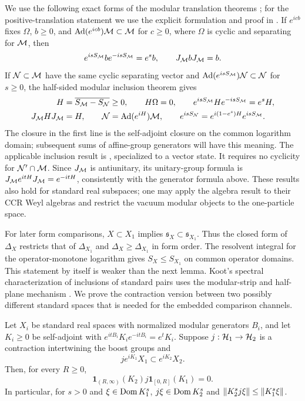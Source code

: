 We use the following exact forms of the modular translation theorems
\cite{Borchers1992,ArakiZsido2005}; for the positive-translation
statement we use the explicit formulation and proof in
\cite[Theorem~II.5.2]{Borchers2000}. If $e^{icb}$ fixes $\Omega$, $b\ge0$,
and $\operatorname{Ad}(e^{icb})\mathcal M\subset\mathcal M$ for $c\ge0$, where $\Omega$ is cyclic
and separating for $\mathcal M$, then
\begin{equation}\label{F:Borchers}
 e^{isS_\mathcal M}b e^{-isS_\mathcal M}=e^s b,\qquad J_\mathcal M bJ_\mathcal M=b.
\end{equation}
If $\mathcal N\subset\mathcal M$ have the same cyclic separating vector and
$\operatorname{Ad}(e^{isS_\mathcal M})\mathcal N\subset\mathcal N$ for $s\ge0$, the
half-sided modular inclusion theorem gives
\begin{equation}\label{F:HSMI}
 \begin{split}
 H&=\overline{S_\mathcal M-S_\mathcal N}\ge0,\qquad H\Omega=0,\qquad
 e^{isS_\mathcal M}He^{-isS_\mathcal M}=e^sH,\\
 J_\mathcal M HJ_\mathcal M&=H,\qquad
 \mathcal N=\operatorname{Ad}(e^{iH})\mathcal M,\qquad
 e^{isS_\mathcal N}=e^{i(1-e^s)H}e^{isS_\mathcal M}.
 \end{split}
\end{equation}
The closure in the first line is the self-adjoint closure on the common
logarithm domain; subsequent sums of affine-group generators will have
this meaning. The applicable inclusion result is
\cite[Theorem~2.1]{ArakiZsido2005}, specialized to a vector state. It
requires no cyclicity for $\mathcal N'\cap\mathcal M$. Since $J_\mathcal M$ is
antiunitary, its unitary-group formula is
$J_\mathcal M e^{itH}J_\mathcal M=e^{-itH}$, consistently with the generator formula
above. These results also hold for standard real subspaces; one may
apply the algebra result to their CCR Weyl algebras and restrict the
vacuum modular objects to the one-particle space.

For later form comparisons, $X\subset X_1$ implies
$\mathfrak s_X\subset\mathfrak s_{X_1}$. Thus the closed form of
$\Delta_X$ restricts that of $\Delta_{X_1}$ and
$\Delta_X\ge\Delta_{X_1}$ in form order. The resolvent integral for the
operator-monotone logarithm gives $S_X\le S_{X_1}$ on common operator
domains. This statement by itself is weaker than the next lemma. Koot's
spectral characterization of inclusions of standard pairs uses the
modular-strip and half-plane mechanism
\cite[Theorem~3.1, Lemma~3.4 and Theorem~3.5]{Koot2025}.
We prove the contraction version between two possibly different
standard spaces that is needed for the embedded comparison channels.

\begin{lemma}\label{F:strip-comparison}
Let $X_i$ be standard real spaces with normalized modular generators
$B_i$, and let $K_i\ge0$ be self-adjoint with
$e^{itB_i}K_i e^{-itB_i}=e^tK_i$. Suppose $j:\mathcal H_1\to\mathcal H_2$ is a
contraction intertwining the boost groups and
\[
 j e^{iK_1}X_1\subset e^{iK_2}X_2.
\]
Then, for every $R\ge0$,
\begin{equation}\label{F:strip-bands}
 \mathbf1_{(R,\infty)}(K_2)j\mathbf1_{[0,R]}(K_1)=0.
\end{equation}
In particular, for $s>0$ and $\xi\in\operatorname{Dom} K_1^s$,
$j\xi\in\operatorname{Dom} K_2^s$ and
$\left\lVert K_2^s j\xi\right\rVert\le\left\lVert K_1^s\xi\right\rVert$.
\end{lemma}

